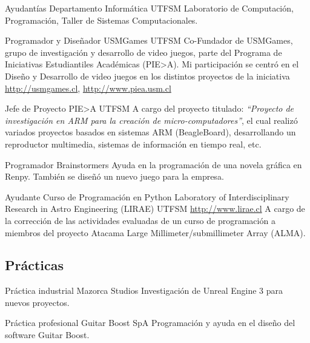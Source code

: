 \documentclass[letter,10pt]{moderncv}
\begin{document}
        {Ayudantías}
        {Departamento Informática}
        {UTFSM}
        {}
        {Laboratorio de Computación, Programación, Taller de Sistemas Computacionales.}

        {Programador y Diseñador}
        {USMGames}
        {UTFSM}
        {Co-Fundador de USMGames, grupo de investigación y desarrollo de video juegos, parte del Programa de Iniciativas Estudiantiles Académicas (PIE>A). Mi participación se centró en el Diseño y Desarrollo de video juegos en los distintos proyectos de la iniciativa}
        {\url{http://usmgames.cl}, \url{http://www.piea.usm.cl}}

        {Jefe de Proyecto}
        {PIE>A}
        {UTFSM}
        {}
        {A cargo del proyecto titulado: \emph{``Proyecto de investigación en ARM para la creación de micro-computadores''}, el cual realizó variados proyectos basados en sistemas ARM (BeagleBoard), desarrollando un reproductor multimedia, sistemas de información en tiempo real, etc.}

        {Programador}
        {Brainstormers}
        {}
    	{}
        {Ayuda en la programación de una novela gráfica en Renpy. También se diseñó un nuevo juego para la empresa.}

        {Ayudante Curso de Programación en Python}
        {Laboratory of Interdisciplinary Research in Astro Engineering (LIRAE)}
        {UTFSM}
        {\url{http://www.lirae.cl}}
        {A cargo de la corrección de las actividades evaluadas de un curso
        de programación a miembros del proyecto Atacama Large Millimeter/submillimeter Array (ALMA).}

\subsection{Prácticas}

        {Práctica industrial}
        {Mazorca Studios}
        {}
        {}
        {Investigación de Unreal Engine 3 para nuevos proyectos.}%

        {Práctica profesional}
        {Guitar Boost SpA}
        {}
        {}
        {Programación y ayuda en el diseño del software Guitar Boost.}%
\end{document}

